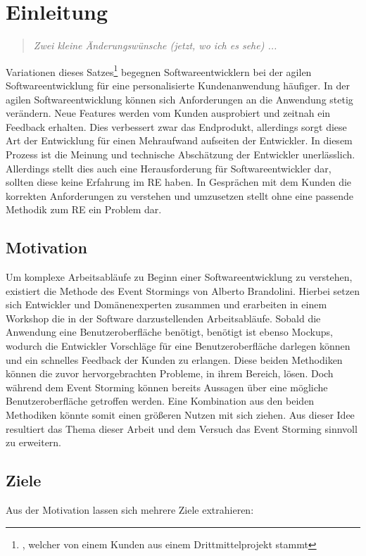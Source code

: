 \chapter{Einleitung}\label{ch:einleitung}

\begin{quote}
    \textit{Zwei kleine Änderungswünsche (jetzt, wo ich es sehe) ...}
\end{quote}


Variationen dieses Satzes\footnote{, welcher von einem Kunden aus einem Drittmittelprojekt stammt}
begegnen Softwareentwicklern bei der agilen Softwareentwicklung für eine personalisierte Kundenanwendung häufiger.
In der agilen Softwareentwicklung können sich Anforderungen an die Anwendung stetig verändern.
Neue Features werden vom Kunden ausprobiert und zeitnah ein Feedback erhalten.
Dies verbessert zwar das Endprodukt, allerdings sorgt diese Art der Entwicklung für einen Mehraufwand aufseiten der Entwickler.
In diesem Prozess ist die Meinung und technische Abschätzung der Entwickler unerlässlich.
Allerdings stellt dies auch eine Herausforderung für Softwareentwickler dar, sollten diese keine Erfahrung im
\ac{RE} haben.
In Gesprächen mit dem Kunden die korrekten Anforderungen zu verstehen und umzusetzen stellt ohne eine passende Methodik zum
\ac{RE} ein Problem dar.

\section{Motivation}\label{sec:motivation}
Um komplexe Arbeitsabläufe zu Beginn einer Softwareentwicklung zu verstehen, existiert die Methode des Event Stormings von Alberto Brandolini.
Hierbei setzen sich Entwickler und Domänenexperten zusammen und erarbeiten in einem Workshop die in der Software darzustellenden Arbeitsabläufe.
Sobald die Anwendung eine Benutzeroberfläche benötigt, benötigt ist ebenso Mockups, wodurch die Entwickler Vorschläge für eine Benutzeroberfläche
darlegen können und ein schnelles Feedback der Kunden zu erlangen.
Diese beiden Methodiken können die zuvor hervorgebrachten Probleme, in ihrem Bereich, lösen.
Doch während dem Event Storming können bereits Aussagen über eine mögliche Benutzeroberfläche getroffen werden.
Eine Kombination aus den beiden Methodiken könnte somit einen größeren Nutzen mit sich ziehen.
Aus dieser Idee resultiert das Thema dieser Arbeit und dem Versuch das Event Storming sinnvoll zu erweitern.

\section{Ziele}\label{sec:ziele}
Aus der Motivation lassen sich mehrere Ziele extrahieren:

